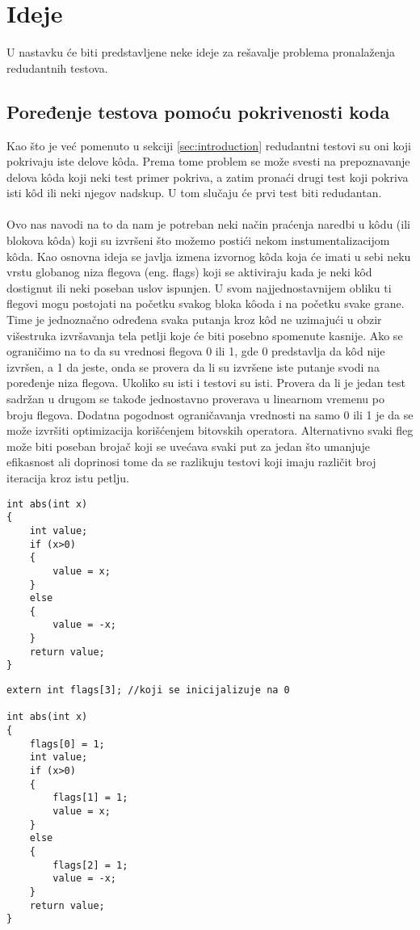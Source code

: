 \documentclass[a4paper]{article}
\begin{document}
\section{Ideje}
\label{sec:ideas}
U nastavku će biti predstavljene neke ideje za rešavalje problema pronalaženja redudantnih testova.

\subsection{Poređenje testova pomoću pokrivenosti koda}
\label{sec:idea1}
Kao što je već pomenuto u sekciji \ref{sec:introduction} redudantni testovi su oni koji pokrivaju iste delove kôda. Prema tome problem se može svesti na prepoznavanje delova kôda koji neki test primer pokriva, a zatim pronaći drugi test koji pokriva isti kôd ili neki njegov nadskup. U tom slučaju će prvi test biti redudantan. \\\\
Ovo nas navodi na to da nam je potreban neki način praćenja naredbi u kôdu (ili blokova kôda) koji su izvršeni što možemo postići nekom instumentalizacijom kôda. Kao osnovna ideja se javlja izmena izvornog kôda koja će imati u sebi neku vrstu globanog niza flegova (eng. flags) koji se aktiviraju kada je neki kôd dostignut ili neki poseban uslov ispunjen. U svom najjednostavnijem obliku ti flegovi mogu postojati na početku svakog bloka kôoda i na početku svake grane. Time je jednoznačno određena svaka putanja kroz kôd ne uzimajući u obzir višestruka izvršavanja tela petlji koje će biti posebno spomenute kasnije. Ako se ograničimo na to da su vrednosi flegova 0 ili 1, gde 0 predstavlja da kôd nije izvršen, a 1 da jeste, onda se provera da li su izvršene iste putanje svodi na poređenje niza flegova. Ukoliko su isti i testovi su isti. Provera da li je jedan test sadržan u drugom se takođe jednostavno proverava u linearnom vremenu po broju flegova. Dodatna pogodnost ograničavanja vrednosti na samo 0 ili 1 je da se može izvršiti optimizacija korišćenjem bitovskih operatora. Alternativno svaki fleg može biti poseban brojač koji se uvećava svaki put za jedan što umanjuje efikasnost ali doprinosi tome da se razlikuju testovi koji imaju različit broj iteracija kroz istu petlju.
\begin{lstlisting}
int abs(int x)
{
	int value;
	if (x>0)
	{
		value = x;
	}
	else
	{
		value = -x;
	}
	return value;
}
\end{lstlisting}

\begin{lstlisting}
extern int flags[3]; //koji se inicijalizuje na 0

int abs(int x)
{
	flags[0] = 1;
	int value;
	if (x>0)
	{
		flags[1] = 1;
		value = x;
	}
	else
	{
		flags[2] = 1;
		value = -x;
	}
	return value;
}
\end{lstlisting}
\end{document}
